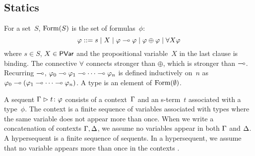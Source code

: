 \documentclass[envcountsame]{llncs}
\begin{document}

\subsection{Statics}
For a set~$S$,
$\mathop{\text{Form}}(S)$ is the set of formulas~$\phi$:
\[
\varphi::= s \mid X \mid \varphi\multimap\varphi\mid \varphi\oplus\varphi\mid
\forall X \varphi
\]
where $s\in S$, $X\in \mathsf{PVar}$ and the propositional variable~$X$ in the
last clause is binding.
The connective $\forall$ connects stronger than $\oplus$, which is
stronger than $\multimap$.
Recurring $\multimap$,
$\varphi_0\multimap\varphi_1\multimap\cdots\multimap\varphi_n$ is defined inductively on~$n$
as
$\varphi_0\multimap(\varphi_1\multimap\cdots\multimap\varphi_n)$.
A type is an element of $\mathop{\text{Form}}(\emptyset)$.

A sequent ${\Gamma}\vartriangleright{ {t} \colon{\varphi} }$ consists of a
context~$\Gamma$ and an s-term~$t$ associated with a type~$\phi$.
The context is a finite sequence of variables associated
with types where the same variable does not appear more than once.
When we write a concatenation of contexts $\Gamma,\Delta$, we assume no variables
appear in both $\Gamma$ and $\Delta$.
A hypersequent is a finite sequence of sequents.
In a hypersequent, we assume that no variable appears more than once in
the contexts%
.
\end{document}
